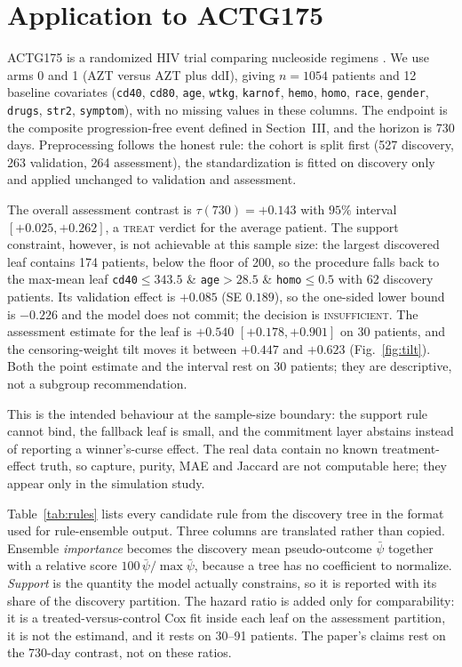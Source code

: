 \documentclass[conference]{IEEEtran}
\begin{document}
\section{Application to ACTG175}

ACTG175 is a randomized HIV trial comparing nucleoside regimens
\cite{actg,actgdata}. We use arms 0 and 1 (AZT versus AZT plus ddI), giving
$n=1054$ patients and 12 baseline covariates (\texttt{cd40}, \texttt{cd80},
\texttt{age}, \texttt{wtkg}, \texttt{karnof}, \texttt{hemo}, \texttt{homo},
\texttt{race}, \texttt{gender}, \texttt{drugs}, \texttt{str2},
\texttt{symptom}), with no missing values in these columns. The endpoint is the
composite progression-free event defined in Section~III, and the horizon is 730
days. Preprocessing follows the honest rule: the cohort is split first
(527 discovery, 263 validation, 264 assessment), the standardization is fitted
on discovery only and applied unchanged to validation and assessment.

The overall assessment contrast is $\tau(730)=+0.143$ with $95\%$ interval
$[+0.025,+0.262]$, a \textsc{treat} verdict for the average patient. The
support constraint, however, is not achievable at this sample size: the largest
discovered leaf contains 174 patients, below the floor of 200, so the procedure
falls back to the max-mean leaf
\texttt{cd40}${}\le343.5$ \& \texttt{age}${}>28.5$ \& \texttt{homo}${}\le0.5$
with 62 discovery patients. Its validation effect is $+0.085$ (SE $0.189$), so
the one-sided lower bound is $-0.226$ and the model does not commit; the
decision is \textsc{insufficient}. The assessment estimate for the leaf is
$+0.540$ $[+0.178,+0.901]$ on 30 patients, and the censoring-weight tilt moves
it between $+0.447$ and $+0.623$ (Fig.~\ref{fig:tilt}). Both the point estimate
and the interval rest on 30 patients; they are descriptive, not a subgroup
recommendation.

This is the intended behaviour at the sample-size boundary: the support rule
cannot bind, the fallback leaf is small, and the commitment layer abstains
instead of reporting a winner's-curse effect. The real data contain no known
treatment-effect truth, so capture, purity, MAE and Jaccard are not computable
here; they appear only in the simulation study.

Table~\ref{tab:rules} lists every candidate rule from the discovery tree in the
format used for rule-ensemble output. Three columns are translated rather than
copied. Ensemble \emph{importance} becomes the discovery mean pseudo-outcome
$\bar\psi$ together with a relative score $100\,\bar\psi/\max\bar\psi$,
because a tree has no coefficient to normalize. \emph{Support} is the quantity
the model actually constrains, so it is reported with its share of the
discovery partition. The hazard ratio is added only for comparability: it is a
treated-versus-control Cox fit inside each leaf on the assessment partition, it
is not the estimand, and it rests on 30--91 patients. The paper's claims rest
on the 730-day contrast, not on these ratios.
\end{document}
